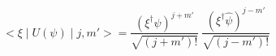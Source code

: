 \begin{equation}
<\xi \mid  U(\psi)\mid j,m'> = \frac{(\xi^\dag \psi)^{j+m'}}{\sqrt{(j+m')!}}~\frac{(\xi^\dag \hat{\psi})^{j-m'}}{\sqrt{(j-m')!}}
\end{equation}

